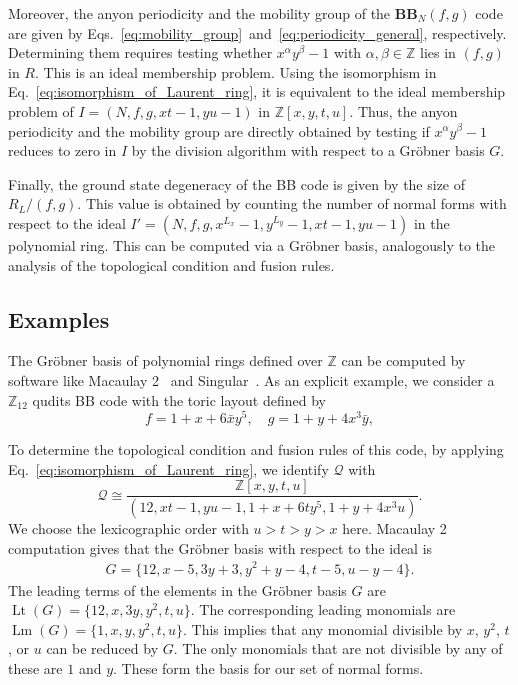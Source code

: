 \documentclass[aps,prb,english,superscriptaddress,twocolumn,tightenlines,showpacs,longbibliography,floatfix,amsfonts]{revtex4-2}
\begin{document}
Moreover, the anyon periodicity and the mobility group of the $\mathbf{BB}_N(f,g)$ code are given by Eqs.~\eqref{eq:mobility_group}~and~\eqref{eq:periodicity_general}, respectively. Determining them requires testing whether $x^{\alpha}y^{\beta}-1$ with $\alpha,\beta\in \mathbb{Z}$ lies in $(f,g)$ in $R$. This is an ideal membership problem. Using the isomorphism in Eq.~\eqref{eq:isomorphism_of_Laurent_ring}, it is equivalent to the ideal membership problem of $I=(N,f,g,xt-1,yu-1)$ in $\mathbb{Z}[x,y,t,u]$. Thus, the anyon periodicity and the mobility group are directly obtained by testing if $x^{\alpha}y^{\beta}-1$ reduces to zero in $I$ by the division algorithm with respect to a Gr\"{o}bner basis $G$.

Finally, the ground state degeneracy of the BB code is given by the size of $R_L/(f,g)$. This value is obtained by counting the number of normal forms with respect to the ideal $ I' = (N,f,g,x^{L_x}-1,y^{L_y}-1,xt-1,yu-1)$ in the polynomial ring. This can be computed via a Gr\"{o}bner basis, analogously to the analysis of the topological condition and fusion rules.

\subsection{Examples}
The Gr\"{o}bner basis of polynomial rings defined over $\mathbb{Z}$ can be computed by software like Macaulay 2~\cite{M2} and Singular~\cite{DGPS}. As an explicit example, we consider a $\mathbb{Z}_{12}$ qudits BB code with the toric layout defined by
\begin{equation}
f=1+x+6\bar{x}y^5,\quad g=1+y+4x^3\bar{y},
\end{equation}
  
To determine the topological condition and fusion rules of this code, by applying Eq.~\eqref{eq:isomorphism_of_Laurent_ring}, we identify $\mathcal{Q}$ with
\begin{equation}
    \mathcal{Q}\cong\frac{\mathbb{Z}[x,y,t,u]}{(12,xt-1,yu-1,1+x+6ty^5,1+y+4x^3u)}.
\end{equation}
We choose the lexicographic order with $u>t>y>x$ here. Macaulay 2 computation gives that the Gr\"{o}bner basis with respect to the ideal is
\begin{align}
    G=\{12, x-5,3y+3,y^2+y-4,t-5,u-y-4\}.
\end{align}
The leading terms of the elements in the Gr\"obner basis $G$ are $\operatorname{Lt}(G)=\{12,x,3y,y^2,t,u\}$. The corresponding leading monomials are $\operatorname{Lm}(G)=\{1,x,y,y^2,t,u\}$. This implies that any monomial divisible by $x$, $y^2$, $t$, or $u$ can be reduced by $G$. The only monomials that are not divisible by any of these are $1$ and $y$. These form the basis for our set of normal forms. 
\end{document}
